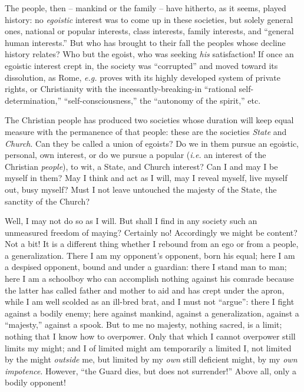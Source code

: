 The people, then -- mankind or the family -- have hitherto, as it seems, 
played history: no \textit{egoistic} interest was to come up in these 
societies, but solely general ones, national or popular interests, class 
interests, family interests, and ``general human interests.'' But who has 
brought to their fall the peoples whose decline history relates? Who but the 
egoist, who was seeking \textit{his} satisfaction! If once an egoistic 
interest crept in, the society was ``corrupted'' and moved toward its 
dissolution, as Rome, \textit{e.g.} proves with its highly developed system 
of private rights, or Christianity with the incessantly-breaking-in 
``rational self-determination,'' ``self-consciousness,'' the ``autonomy 
of the spirit,'' etc.

The Christian people has produced two societies whose duration will keep equal 
measure with the permanence of that people: these are the societies 
\textit{State} and \textit{Church}. Can they be called a union of egoists? Do 
we in them pursue an egoistic, personal, own interest, or do we pursue a 
popular (\textit{i.e.} an interest of the Christian \textit{people}), to wit, 
a State, and Church interest? Can I and may I be myself in them? May I think 
and act as I will, may I reveal myself, live myself out, busy myself? Must I 
not leave untouched the majesty of the State, the sanctity of the Church?

Well, I may not do so as I will. But shall I find in any society such an 
unmeasured freedom of maying? Certainly no! Accordingly we might be content? 
Not a bit! It is a different thing whether I rebound from an ego or from a 
people, a generalization. There I am my opponent's opponent, born his equal; 
here I am a despised opponent, bound and under a guardian: there I stand man 
to man; here I am a schoolboy who can accomplish nothing against his comrade 
because the latter has called father and mother to aid and has crept under the 
apron, while I am well scolded as an ill-bred brat, and I must not 
``argue'': there I fight against a bodily enemy; here against mankind, 
against a generalization, against a ``majesty,'' against a spook. But to me 
no majesty, nothing sacred, is a limit; nothing that I know how to overpower. 
Only that which I cannot overpower still limits my might; and I of limited 
might am temporarily a limited I, not limited by the might \textit{outside} 
me, but limited by my \textit{own} still deficient might, by my \textit{own 
impotence}. However, ``the Guard dies, but does not surrender!'' Above all, 
only a bodily opponent!


